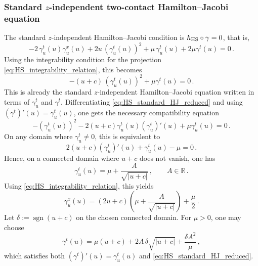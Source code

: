 \documentclass[11pt,twoside]{article}
\theoremstyle{plain}
\theoremstyle{definition}
\theoremstyle{remark}
\begin{document}
\subsubsection{Standard $z$-independent two-contact Hamilton--Jacobi equation}

The standard $z$-independent Hamilton--Jacobi condition is $h_{\rm HS}\circ\gamma=0$, that is,
\begin{equation}\label{eq:HS_standard_HJ}
-2\,\gamma_u^t(u)\gamma_u^x(u)+2u\,(\gamma_u^t(u))^2+\mu\,\gamma_u^t(u)+2\mu\gamma^t(u)=0\,.
\end{equation}
Using  the integrability condition for the projection \eqref{eq:HS_integrability_relation}, this becomes
\begin{equation}\label{eq:HS_standard_HJ_reduced}
-(u+c)\,(\gamma_u^t(u))^2+\mu \gamma^t(u)=0\,.
\end{equation}
This is already the standard  $z$-independent Hamilton--Jacobi equation written in terms of $\gamma_u^t$ and $\gamma^t$. Differentiating \eqref{eq:HS_standard_HJ_reduced} and using $(\gamma^t)'(u)=\gamma_u^t(u)$, one gets the necessary compatibility equation
\begin{equation}\label{eq:HS_standard_gammaODE}
-(\gamma_u^t(u))^2-2(u+c)\gamma_u^t(u)(\gamma_u^t)'(u)+\mu\gamma_u^t(u)=0\,.
\end{equation}
On any domain where $\gamma_u^t\neq0$, this is equivalent to
\begin{equation}\label{eq:HS_standard_gammaODE_linear}
2(u+c)(\gamma_u^t)'(u)+\gamma_u^t(u)-\mu=0\,.
\end{equation}
Hence, on a connected domain where $u+c$ does not vanish, one has
\begin{equation}\label{eq:HS_general_gamma_t}
\gamma_u^t(u)=\mu+\frac{A}{\sqrt{|u+c|}}\,,\qquad A\in\mathbb R\,.
\end{equation}
Using \eqref{eq:HS_integrability_relation}, this yields
\begin{equation}\label{eq:HS_general_gamma_x}
\gamma_u^x(u)=(2u+c)\left(\mu+\frac{A}{\sqrt{|u+c|}}\right)+\frac{\mu}{2}\,.
\end{equation}
Let $\delta:=\operatorname{sgn}(u+c)$ on the chosen connected domain. For $\mu>0$, one may choose
\begin{equation}\label{eq:HS_general_S_t}
\gamma^t(u)=\mu(u+c)+2A\,\delta\sqrt{|u+c|}+\frac{\delta A^2}{\mu}\,,
\end{equation}
which satisfies both $(\gamma^t)'(u)=\gamma_u^t(u)$ and \eqref{eq:HS_standard_HJ_reduced}.
\end{document}
